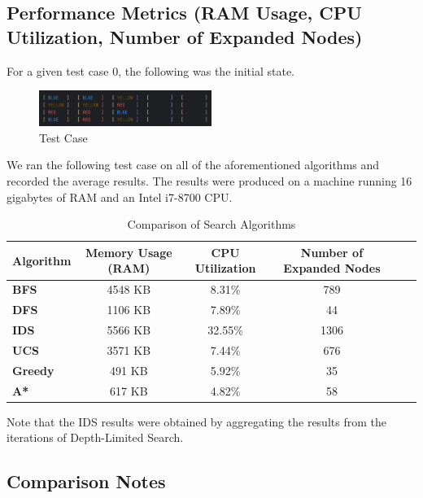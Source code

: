 \documentclass{article}
\begin{document}
\subsection{Performance Metrics (RAM Usage, CPU Utilization, Number of Expanded Nodes)}

For a given test case 0, the following was the initial state.
\begin{figure}[ht]
    \centering
    \includegraphics[width=0.5\textwidth]{TestCase1.png}
    \caption{Test Case}
    \label{fig:testcase1}
\end{figure}

We ran the following test case on all of the aforementioned algorithms and recorded the average results. The results were produced on a machine running 16 gigabytes of RAM and an Intel i7-8700 CPU.

\begin{table}[H]
    \centering
    \begin{tabular}{|l|c|c|c|c|c|}
        \hline
        \textbf{Algorithm} & \textbf{Memory Usage (RAM)} & \textbf{CPU Utilization} & \textbf{Number of Expanded Nodes} \\ \hline
        \textbf{BFS} & 4548 KB & 8.31\% & 789 \\ \hline
        \textbf{DFS} & 1106 KB & 7.89\% & 44 \\ \hline
        \textbf{IDS} & 5566 KB & 32.55\% & 1306 \\ \hline
        \textbf{UCS} & 3571 KB & 7.44\% & 676 \\ \hline
        \textbf{Greedy} & 491 KB & 5.92\% & 35 \\ \hline
        \textbf{A*} & 617 KB & 4.82\% & 58 \\ \hline
    \end{tabular}
    \caption{Comparison of Search Algorithms}
\end{table}

Note that the IDS results were obtained by aggregating the results from the iterations of Depth-Limited Search.

\subsection{Comparison Notes}
\end{document}
